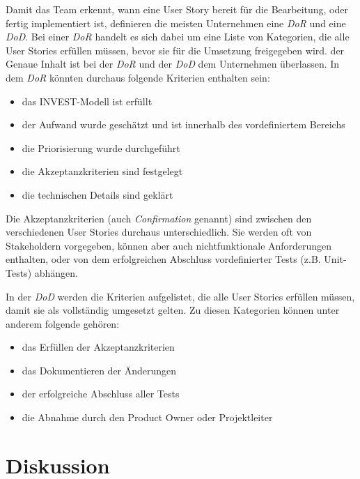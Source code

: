 \documentclass[acmtog]{acmart}
\begin{document}
Damit das Team erkennt, wann eine User Story bereit für die Bearbeitung, oder fertig implementiert ist, definieren die meisten Unternehmen eine \emph{DoR} und eine \emph{DoD}.
Bei einer \emph{DoR} handelt es sich dabei um eine Liste von Kategorien, die alle User Stories erfüllen müssen, bevor sie für die Umsetzung freigegeben wird. der Genaue Inhalt
ist bei der \emph{DoR} und der \emph{DoD} dem Unternehmen überlassen. In dem \emph{DoR} könnten durchaus folgende Kriterien enthalten sein:
\begin{itemize}
	\item das INVEST-Modell ist erfüllt
	\item der Aufwand wurde geschätzt und ist innerhalb des vordefiniertem Bereichs
	\item die Priorisierung wurde durchgeführt
	\item die Akzeptanzkriterien sind festgelegt
	\item die technischen Details sind geklärt
\end{itemize}

Die Akzeptanzkriterien (auch \emph{Confirmation} genannt) sind zwischen den verschiedenen User Stories durchaus unterschiedlich.
Sie werden oft von Stakeholdern vorgegeben, können aber auch nichtfunktionale Anforderungen enthalten, oder von dem erfolgreichen
Abschluss vordefinierter Tests (z.B. Unit-Tests) abhängen.

In der \emph{DoD} werden die Kriterien aufgelistet, die alle User Stories erfüllen müssen, damit sie als vollständig umgesetzt gelten. Zu diesen Kategorien können unter anderem
folgende gehören:
\begin{itemize}
	\item das Erfüllen der Akzeptanzkriterien
	\item das Dokumentieren der Änderungen
	\item der erfolgreiche Abschluss aller Tests
	\item die Abnahme durch den Product Owner oder Projektleiter
\end{itemize}

\section{Diskussion}
\end{document}
